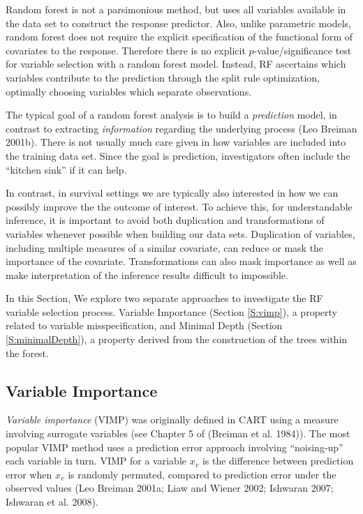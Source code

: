\documentclass[article]{jss}
\begin{document}
Random forest is not a parsimonious method, but uses all variables
available in the data set to construct the response predictor. Also,
unlike parametric models, random forest does not require the explicit
specification of the functional form of covariates to the response.
Therefore there is no explicit \(p\)-value/significance test for
variable selection with a random forest model. Instead, RF ascertains
which variables contribute to the prediction through the split rule
optimization, optimally choosing variables which separate observations.

The typical goal of a random forest analysis is to build a
\emph{prediction} model, in contrast to extracting \emph{information}
regarding the underlying process (Leo Breiman 2001b). There is not
usually much care given in how variables are included into the training
data set. Since the goal is prediction, investigators often include the
``kitchen sink'' if it can help.

In contrast, in survival settings we are typically also interested in
how we can possibly improve the the outcome of interest. To achieve
this, for understandable inference, it is important to avoid both
duplication and transformations of variables whenever possible when
building our data sets. Duplication of variables, including multiple
measures of a similar covariate, can reduce or mask the importance of
the covariate. Transformations can also mask importance as well as make
interpretation of the inference results difficult to impossible.

In this Section, We explore two separate approaches to investigate the
RF variable selection process. Variable Importance (Section
\ref{S:vimp}), a property related to variable misspecification, and
Minimal Depth (Section \ref{S:minimalDepth}), a property derived from
the construction of the trees within the forest.

\subsection{Variable Importance}\label{variable-importance}

\emph{Variable importance} (VIMP) was originally defined in CART using a
measure involving surrogate variables (see Chapter 5 of (Breiman et al.
1984)). The most popular VIMP method uses a prediction error approach
involving ``noising-up'' each variable in turn. VIMP for a variable
\(x_v\) is the difference between prediction error when \(x_v\) is
randomly permuted, compared to prediction error under the observed
values (Leo Breiman 2001a; Liaw and Wiener 2002; Ishwaran 2007; Ishwaran
et al. 2008).
\end{document}
